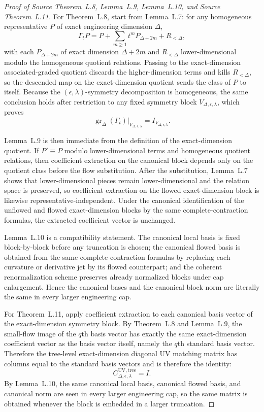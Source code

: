 \begin{proof}[Proof of Source Theorem~L.8, Lemma~L.9, Lemma~L.10, and Source Theorem~L.11]
For Theorem~L.8, start from Lemma~L.7: for any homogeneous representative $P$ of exact engineering dimension $\Delta$,
\[
\Gamma_t P = P + \sum_{m\ge 1} t^m P_{\Delta+2m} + R_{<\Delta},
\]
with each $P_{\Delta+2m}$ of exact dimension $\Delta+2m$ and $R_{<\Delta}$ lower-dimensional modulo the homogeneous quotient relations. Passing to the exact-dimension associated-graded quotient discards the higher-dimension terms and kills $R_{<\Delta}$, so the descended map on the exact-dimension quotient sends the class of $P$ to itself. Because the $(\epsilon,\lambda)$-symmetry decomposition is homogeneous, the same conclusion holds after restriction to any fixed symmetry block $V_{\Delta,\epsilon,\lambda}$, which proves
\[
\operatorname{gr}_{\Delta}(\Gamma_t)\big|_{V_{\Delta,\epsilon,\lambda}} = I_{V_{\Delta,\epsilon,\lambda}}.
\]

Lemma~L.9 is then immediate from the definition of the exact-dimension quotient. If $P'\equiv P$ modulo lower-dimensional terms and homogeneous quotient relations, then coefficient extraction on the canonical block depends only on the quotient class before the flow substitution. After the substitution, Lemma~L.7 shows that lower-dimensional pieces remain lower-dimensional and the relation space is preserved, so coefficient extraction on the flowed exact-dimension block is likewise representative-independent. Under the canonical identification of the unflowed and flowed exact-dimension blocks by the same complete-contraction formulas, the extracted coefficient vector is unchanged.

Lemma~L.10 is a compatibility statement. The canonical local basis is fixed block-by-block before any truncation is chosen; the canonical flowed basis is obtained from the same complete-contraction formulas by replacing each curvature or derivative jet by its flowed counterpart; and the coherent renormalization scheme preserves already normalized blocks under cap enlargement. Hence the canonical bases and the canonical block norm are literally the same in every larger engineering cap.

For Theorem~L.11, apply coefficient extraction to each canonical basis vector of the exact-dimension symmetry block. By Theorem~L.8 and Lemma~L.9, the small-flow image of the $q$th basis vector has exactly the same exact-dimension coefficient vector as the basis vector itself, namely the $q$th standard basis vector. Therefore the tree-level exact-dimension diagonal UV matching matrix has columns equal to the standard basis vectors and is therefore the identity:
\[
C^{\mathrm{UV,tree}}_{\Delta,\epsilon,\lambda}=I.
\]
By Lemma~L.10, the same canonical local basis, canonical flowed basis, and canonical norm are seen in every larger engineering cap, so the same matrix is obtained whenever the block is embedded in a larger truncation.
\end{proof}

